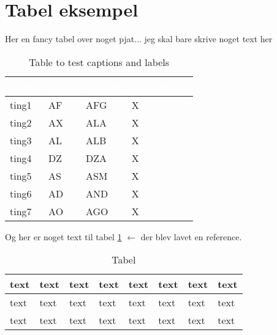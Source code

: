 

\listoffixmes
\section{Tabel eksempel}
Her en fancy tabel over noget pjat... jeg skal bare skrive noget text her

\begin{table}[H]
\centering
{ %
\setlength{\arrayrulewidth}{0.2mm}					 %
\setlength{\tabcolsep}{10pt}						 %
\renewcommand{\arraystretch}{1.5}					 %
\center
\begin{tabular}{ |p{2cm}|p{2cm}|p{2cm}|p{5cm}|}		 %
\hline
\rowcolor{white!20!black!90}
\textcolor{white}{\large{\textbf{Name}}} &	
\textcolor{white}{\large{\textbf{Input}}}&	
\textcolor{white}{\large{\textbf{Output}}}&
\textcolor{white}{\large{\textbf{Description}}}\\
\hline
ting1	 	& AF	 	& AFG 	& X\\
ting2  	 	& AX   		& ALA 	& X\\
ting3 	 	& AL 		& ALB 	& X\\
ting4   	& DZ 		& DZA 	& X\\
ting5 		& AS		& ASM 	& X\\
ting6 		& AD 		& AND   & X\\
ting7 		& AO 		& AGO 	& X\\
\hline
\end{tabular}
}
\caption{Table to test captions and labels}
\label{table:eksempelf}
\end{table}

Og her er noget text til tabel \ref{table:eksempelf} $\leftarrow$ der blev lavet en reference.

\begin{table}[H]
\centering
\begin{tabular}{ | l | l | l | l | l | l | l | l |}
\hline
text & text & text & text & text & text & text & text \\
\hline
text & text & text & text & text & text & text & text \\
\hline
text & text & text & text & text & text & text & text \\
\hline  
\end{tabular}
\caption{Tabel}
\label{table:eksempels}
\end{table}

